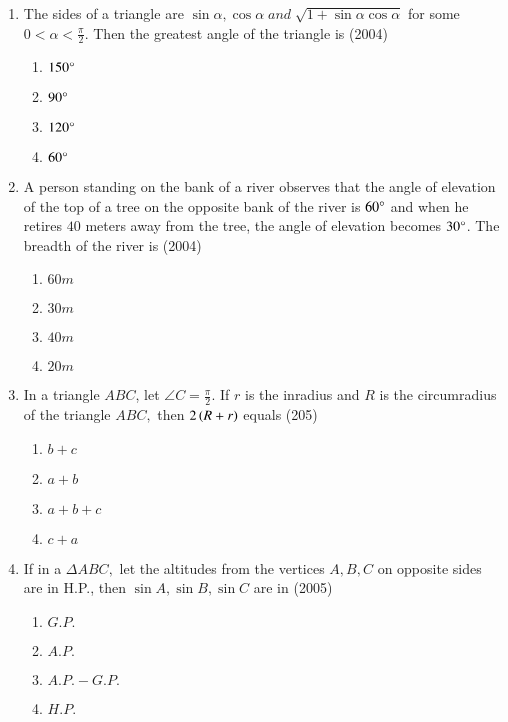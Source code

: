 \documentclass[journal,12pt,twocolumn]{IEEEtran}
\theoremstyle{remark}
\begin{document}
\begin{enumerate}[start =3]
\item The sides of a triangle are $\sin\alpha,\cos\alpha\;and\;\sqrt{1+\sin\alpha\cos\alpha}$ for some $0<\alpha<\frac{\pi}{2}.$ Then the greatest angle of the triangle is \hfill{(2004)}
\begin{multicols}{4}
\begin{enumerate}
        \item $150\degree$                    
        \item $90\degree$ 
        \item $120\degree$
        \item $60\degree$
\end{enumerate}
\end{multicols} 

\item A person standing on the bank of a river observes that the angle of elevation of the top of a tree on the opposite bank of the river is $60\degree$ and when he retires $40$ meters away from the tree, the angle of elevation becomes $30\degree$. The breadth of the river is \hfill{(2004)}
\begin{multicols}{4}
\begin{enumerate}
        \item $60m$                    
        \item $30m$ 
        \item $40m$ 
        \item $20m$
\end{enumerate}
\end{multicols} 

\item In a triangle $ABC$, let $\angle{C}=\frac{\pi}{2}.$ If $r$ is the inradius and $R$ is the circumradius of the triangle $ABC,$ then $2\left(R+r\right)$ equals \hfill{(205)}
\begin{multicols}{4}
\begin{enumerate}
        \item $b+c$                    
        \item $a+b$ 
        \item $a+b+c$ 
        \item $c+a$
\end{enumerate}
\end{multicols} 

\item If in a $\Delta ABC,$ let the altitudes from the vertices $A,B,C$ on opposite sides are in H.P., then $\sin A,\sin B,\sin C$ are in \hfill{(2005)}
\begin{multicols}{2}
\begin{enumerate}
        \item $G.P.$                    
        \item $A.P.$ 
        \item $A.P.-G.P.$ 
        \item $H.P.$
\end{enumerate}
\end{multicols} 


\end{enumerate}
\end{document}
